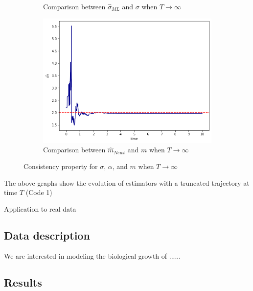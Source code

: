 \documentclass[12pt, reqno]{amsart}
\makeatletter
\def\section{\@startsection{section}{1}%
     \z@{.7\linespacing\@plus\linespacing}{.5\linespacing}%
     {\bfseries
     \centering
     }}
\newcommand{\1}{{\bf 1}}
\newcommand{\2}{{\bf 2}}
\theoremstyle{definition}
\theoremstyle{remark}
\numberwithin{equation}{section}
\makeatother
\begin{document}
\begin{figure}
\begin{subfigure}[b]{0.3\textwidth}
    \caption{Comparison between $\hat{\sigma}_{ML}$ and $\sigma$ when $T \rightarrow \infty$}
    \label{fig:f2}
  \end{subfigure}
  \hfill
  \begin{subfigure}[b]{0.3\textwidth}
    \centering
    \includegraphics[width=\textwidth]{mOverTime.png}
    \caption{Comparison between $\hat{m}_{Newt}$ and $m$ when $T \rightarrow \infty$}
    \label{fig:f3}
  \end{subfigure}
  \caption{Consistency property for $\sigma$, $\alpha$, and $m$ when $T \rightarrow \infty$}
  \label{fig:consistency}
\end{figure}



{\color{red} The above graphs show the evolution of estimators with a truncated trajectory at time $T$ (Code 1)}

\section{Application to real data}\label{sec-appl}




\subsection{Data description}

We are interested in modeling the biological growth of ......




\subsection{Results}
\end{document}

